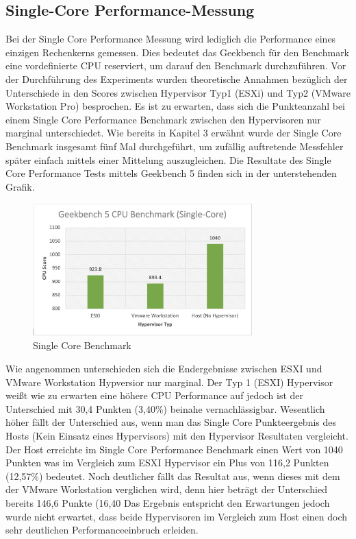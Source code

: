 \documentclass[conference]{IEEEtran}
\begin{document}
\subsection{Single-Core Performance-Messung}
Bei der Single Core Performance Messung wird lediglich die Performance eines einzigen Rechenkerns gemessen. Dies bedeutet das Geekbench für den Benchmark eine vordefinierte CPU reserviert, um darauf den Benchmark durchzuführen. Vor der Durchführung des Experiments wurden theoretische Annahmen bezüglich der Unterschiede in den Scores zwischen Hypervisor Typ1 (ESXi) und Typ2 (VMware Workstation Pro) besprochen. Es ist zu erwarten, dass sich die Punkteanzahl bei einem Single Core Performance Benchmark zwischen den Hypervisoren nur marginal unterschiedet.
Wie bereits in Kapitel 3 erwähnt wurde der Single Core Benchmark insgesamt fünf Mal durchgeführt, um zufällig auftretende Messfehler später einfach mittels einer Mittelung auszugleichen. Die Resultate des Single Core Performance Tests mittels Geekbench 5 finden sich in der unterstehenden Grafik. \newline 

\begin{figure}[!h]
	\centering
	\includegraphics[keepaspectratio,width=8.5cm,height=0.75\textheight]{singlecore.png}
	\caption{Single Core Benchmark}
	\label{singlecore}
\end{figure}

Wie angenommen unterschieden sich die Endergebnisse zwischen ESXI und VMware Workstation Hypversior nur marginal. Der Typ 1 (ESXI) Hypervisor weißt wie zu erwarten eine höhere CPU Performance auf jedoch ist der Unterschied mit 30,4 Punkten (3,40\%) beinahe vernachlässigbar. Wesentlich höher fällt der Unterschied aus, wenn man das Single Core Punkteergebnis des Hosts (Kein Einsatz eines Hypervisors) mit den Hypervisor Resultaten vergleicht. Der Host erreichte im Single Core Performance Benchmark einen Wert von 1040 Punkten was im Vergleich zum ESXI Hypervisor ein Plus von 116,2 Punkten (12,57\%) bedeutet. Noch deutlicher fällt das Resultat aus, wenn dieses mit dem der VMware Workstation verglichen wird, denn hier beträgt der Unterschied bereits 146,6 Punkte (16,40%
Das Ergebnis entspricht den Erwartungen jedoch wurde nicht erwartet, dass beide Hypervisoren im Vergleich zum Host einen doch sehr deutlichen Performanceeinbruch erleiden.
\end{document}
